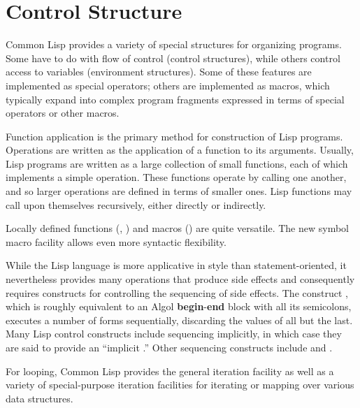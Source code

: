 
\clearpage\def\pagestatus{ULTIMATE}

\ifx \rulang\Undef
\chapter{Control Structure}
\label{CONTRL}

Common Lisp provides a variety of special structures for organizing
programs.  Some have to do with flow of control (control structures),
while others control access to variables (environment structures).
Some of these features are implemented as special operators;
others are implemented as macros, which typically expand into
complex program fragments expressed in terms of special operators
or other macros.

Function application is the primary method for construction of Lisp
programs.  Operations are written as the application of a function
to its arguments.  Usually, Lisp programs are written as a large collection
of small functions, each of which implements a simple operation.
These functions operate by calling one another, and so larger
operations are defined in terms of smaller ones.
Lisp functions may call upon themselves recursively,
either directly or indirectly.

Locally defined functions (, ) and macros ()
are quite versatile.
The new symbol macro facility allows even more syntactic flexibility.

While the Lisp language
is more applicative in style than statement-oriented, it
nevertheless provides many operations that produce side effects and
consequently requires constructs for controlling the sequencing of
side effects.  The construct
, which is roughly equivalent to an Algol \textbf{begin}-\textbf{end}
block with all its semicolons, executes a number of forms sequentially,
discarding the values of all but the last.
Many Lisp control constructs
include sequencing implicitly, in which case they are said to
provide an ``implicit .''
Other sequencing constructs include  and .

For looping, Common Lisp provides the general iteration facility
 as well as a variety
of special-purpose iteration facilities for iterating or mapping
over various data structures.

